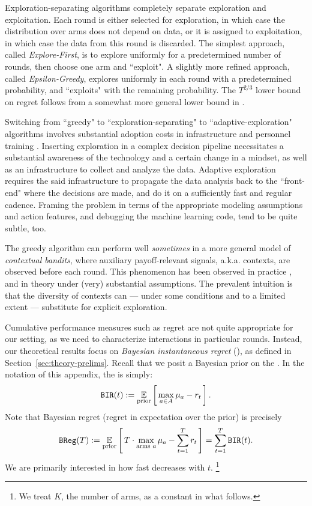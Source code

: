 Exploration-separating algorithms completely separate exploration and exploitation. Each round is either selected for exploration, in which case  the distribution over arms does not depend on data, or it is assigned to exploitation, in which case the data from this round is discarded. The simplest approach, called \emph{Explore-First}, is to explore uniformly for a predetermined number of rounds, then choose one arm and ``exploit". A slightly more refined approach, called \emph{Epsilon-Greedy}, explores uniformly in each round with a predetermined probability, and ``exploits" with the remaining probability. The $T^{2/3}$ lower bound on regret follows from a somewhat more general lower bound in \citet{MechMAB-ec09}.

Switching from ``greedy" to ``exploration-separating" to ``adaptive-exploration" algorithms involves substantial adoption costs in infrastructure and personnel training \citep{DS-arxiv}. Inserting exploration in a complex decision pipeline necessitates a substantial awareness of the technology and a certain change in a mindset, as well as an infrastructure to collect and analyze the data. Adaptive exploration requires the said infrastructure to propagate the data analysis back to the ``front-end" where the decisions are made, and do it on a sufficiently fast and regular cadence. Framing the problem in terms of the appropriate modeling assumptions and action features, and debugging the machine learning code, tend to be quite subtle, too.

The greedy algorithm can perform well \emph{sometimes} in a more general model of \emph{contextual bandits}, where auxiliary payoff-relevant signals, a.k.a. contexts, are observed before each round. This phenomenon has been observed in practice
\citep{practicalCB-arxiv18}, and in theory \citep{kannan2018smoothed,bastani2017exploiting,externalities-colt18} under (very) substantial assumptions. The prevalent intuition is that the diversity of contexts can --- under some conditions and to a limited extent --- substitute for explicit exploration.

Cumulative performance measures such as regret are not quite appropriate for our setting, as we need to characterize interactions in particular rounds. Instead, our theoretical results focus on \emph{Bayesian instantaneous regret} (\BIR), as defined in Section~\ref{sec:theory-prelims}. Recall that we posit a Bayesian prior on the \MRVs. In the notation of this appendix, the \BIR is simply:
\begin{align*}%
\BIR(t) := \E_{\text{prior}}\sbr{ \max_{a\in A} \mu_a - r_t}.
\end{align*}
\noindent Note that Bayesian regret (\ie regret in expectation over the prior) is precisely
\begin{align}\label{eq:bg-BReg}
  \BReg(T):= 
    \E_{\text{prior}}\sbr{ T\cdot \max_{\text{arms $a$}}\mu_a - \sum_{t=1}^T r_t }
    = \sum_{t=1}^T \BIR(t).
\end{align}
We are primarily interested in how fast \BIR decreases with $t$.%
\footnote{We treat $K$, the number of arms, as a constant in what follows.}


